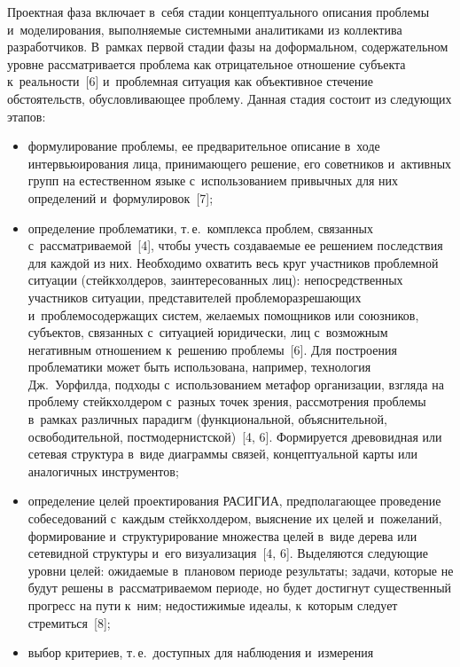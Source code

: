 \begin{multicols}{2}
  Проектная фаза включает в~себя стадии концептуального описания проб\-ле\-мы и~моделирования, выполняемые сис\-тем\-ны\-ми аналитиками из коллектива 
разработчиков. В~рамках первой стадии фазы на доформальном, 
содержательном уровне рас\-смат\-ри\-ва\-ет\-ся проб\-ле\-ма как отрицательное 
отношение субъекта к~реальности~[6] и~проблемная ситуация как объективное 
стечение обстоятельств, обуслов\-ли\-ва\-ющее проб\-ле\-му. Данная стадия со\-сто\-ит из 
сле\-ду\-ющих этапов:
  \begin{itemize}
\item формулирование проб\-ле\-мы, ее предварительное описание в~ходе 
интервьюирования лица, при\-ни\-ма\-юще\-го решение, его советников и~активных 
групп на естественном языке с~использованием привычных для них 
определений и~формулировок~[7];
  \item определение проб\-ле\-ма\-ти\-ки, т.\,е.\ комплекса проб\-лем, связанных 
с~рас\-смат\-ри\-ва\-емой~[4], чтобы учесть создаваемые ее решением последствия 
для каж\-дой из них. Необходимо охватить весь круг участников проб\-лем\-ной 
ситуации (стейкхолдеров, заинтересованных лиц): непосредственных 
участников ситуации, пред\-ста\-ви\-те\-лей проб\-ле\-мо\-раз\-ре\-ша\-ющих 
и~проб\-ле\-мо\-со\-дер\-жа\-щих сис\-тем, же\-ла\-емых помощников или союзников, 
субъектов, связанных с~ситуацией юридически, лиц с~возможным негативным 
отношением к~решению проб\-ле\-мы~[6]. Для по\-стро\-ения проб\-ле\-ма\-ти\-ки может 
быть использована, например, технология Дж.~Уор\-фил\-да, подходы 
с~использованием метафор организации, взгляда на проблему стейкхолдером 
с~раз\-ных точек зрения, рас\-смот\-ре\-ния проб\-ле\-мы в~рамках различных парадигм 
(функциональной, объяснительной, освободительной, пост\-мо\-дер\-нист\-ской)~[4, 6]. 
Формируется древовидная или сетевая структура в~виде диаграммы связей, 
концептуальной кар\-ты или аналогичных инструментов;
  \item определение целей проектирования \mbox{РАСИГИА}, 
пред\-по\-ла\-га\-ющее проведение собеседований с~каж\-дым стейк\-хол\-де\-ром, 
выяснение их целей и~пожеланий, формирование и~структурирование 
множества целей в~виде дерева или сетевидной структуры и~его 
визуализация~[4, 6]. Выделяются следующие уровни целей: ожи\-да\-емые 
в~плановом периоде результаты; задачи, которые не будут решены 
в~рас\-смат\-ри\-ва\-емом периоде, но будет достигнут существенный прогресс на 
пути к~ним; не\-до\-сти\-жи\-мые идеалы, к~которым следует стремиться~[8];
  \item выбор критериев, т.\,е.\ до\-ступ\-ных для наблюдения и~измерения 

\end{itemize}
\end{multicols}
